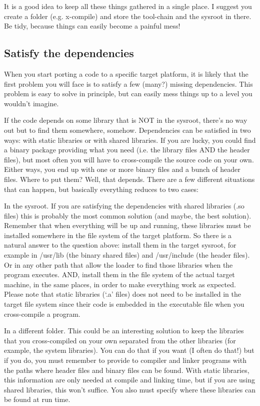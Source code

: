 It is a good idea to keep all these things gathered in a single place.
I suggest you create a folder (e.g. x-compile) and store the tool-chain and the sysroot in there.
Be tidy, because things can easily become a painful mess!


\subsection{Satisfy the dependencies}

When you start porting a code to a specific target platform, it is likely that the first problem you will face is to satisfy a few (many?) missing dependencies. This problem is easy to solve in principle, but can easily mess things up to a level you wouldn’t imagine.

If the code depends on some library that is NOT in the sysroot, there’s no way out but to find them somewhere, somehow. Dependencies can be satisfied in two ways: with static libraries or with shared libraries. If you are lucky, you could find a binary package providing what you need (i.e. the library files AND the header files), but most often you will have to cross-compile the source code on your own. Either ways, you end up with one or more binary files and a bunch of header files. Where to put them? Well, that depends. There are a few different situations that can happen, but basically everything reduces to two cases:

In the sysroot. If you are satisfying the dependencies with shared libraries (.so files) this is probably the most common solution (and maybe, the best solution). Remember that when everything will be up and running, these libraries must be installed somewhere in the file system of the target platform. So there is a natural answer to the question above: install them in the target sysroot, for example in /usr/lib (the binary shared files) and /usr/include (the header files). Or in any other path that allow the loader to find those libraries when the program executes. AND, install them in the file system of the actual target machine, in the same places, in order to make everything work as expected. Please note that static libraries (‘.a’ files) does not need to be installed in the target file system since their code is embedded in the executable file when you cross-compile a program.

In a different folder. This could be an interesting solution to keep the libraries that you cross-compiled on your own separated from the other libraries (for example, the system libraries). You can do that if you want (I often do that!) but if you do, you must remember to provide to compiler and linker programs with the paths where header files and binary files can be found. With static libraries, this information are only needed at compile and linking time, but if you are using shared libraries, this won’t suffice. You also must specify where these libraries can be found at run time.

